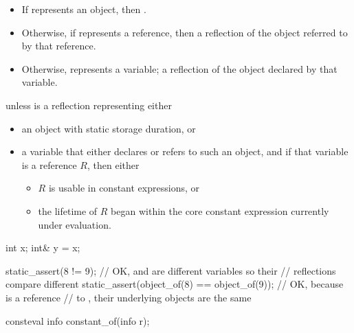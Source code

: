 \begin{itemdescr}
\pnum
\returns
\begin{itemize}
\item
  If  represents an object,
  then .
\item
  Otherwise, if  represents a reference,
  then a reflection of the object referred to by that reference.
\item
  Otherwise,  represents a variable;
  a reflection of the object declared by that variable.
\end{itemize}

\pnum
\throws
{} unless
 is a reflection representing either
\begin{itemize}
\item
  an object with static storage duration, or
\item
  a variable that either declares or refers to such an object,
  and if that variable is a reference $R$, then either
  \begin{itemize}
  \item
    $R$ is usable in constant expressions, or
  \item
    the lifetime of $R$ began within the core constant expression
    currently under evaluation.
  \end{itemize}
\end{itemize}

\pnum
\begin{example}
\begin{codeblock}
int x;
int& y = x;

static_assert(^^x != ^^y);                          // OK,  and  are different variables so their
                                                    // reflections compare different
static_assert(object_of(^^x) == object_of(^^y));    // OK, because  is a reference
                                                    // to , their underlying objects are the same
\end{codeblock}
\end{example}
\end{itemdescr}

%
\begin{itemdecl}
consteval info constant_of(info r);
\end{itemdecl}

